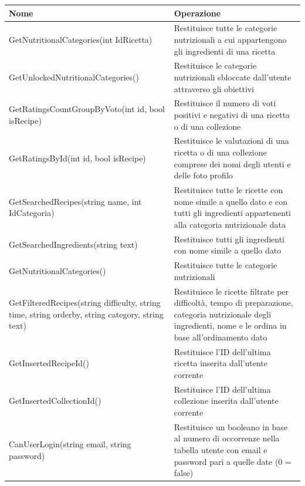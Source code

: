 ﻿\documentclass[a4paper,12pt]{report}
\begin{document}
\begin{table}[h!]
    \centering
    \begin{tabular}{ |p{3in}|p{2in}| }
        \hline
        \scriptsize{\textbf{Nome}} & \scriptsize{\textbf{Operazione}} \\
        \hline
        \scriptsize{GetNutritionalCategories(int IdRicetta)} & \scriptsize{Restituisce tutte le categorie nutrizionali a cui appartengono gli ingredienti di una ricetta} \\
        \hline
        \scriptsize{GetUnlockedNutritionalCategories()} & \scriptsize{Restituisce le categorie nutrizionali sbloccate dall'utente attraverso gli obiettivi} \\
        \hline
        \scriptsize{GetRatingsCountGroupByVoto(int id, bool isRecipe)} & \scriptsize{Restituisce il numero di voti positivi e negativi di una ricetta o di una collezione} \\
        \hline
        \scriptsize{GetRatingsById(int id, bool isRecipe)} & \scriptsize{Restituisce le valutazioni di una ricetta o di una collezione comprese dei nomi degli utenti e delle foto profilo} \\
        \hline
        \scriptsize{GetSearchedRecipes(string name, int IdCategoria)} & \scriptsize{Restituisce tutte le ricette con nome simile a quello dato e con tutti gli ingredienti appartenenti alla categoria nutrizionale data} \\
        \hline
        \scriptsize{GetSearchedIngredients(string text)} & \scriptsize{Restituisce tutti gli ingredienti con nome simile a quello dato} \\
        \hline
        \scriptsize{GetNutritionalCategories()} & \scriptsize{Restituisce tutte le categorie nutrizionali} \\
        \hline
        \scriptsize{GetFilteredRecipes(string difficulty, string time, string orderby, string category, string text)} & \scriptsize{Restituisce le ricette filtrate per difficoltà, tempo di preparazione, categoria nutrizionale degli ingredienti, nome e le ordina in base all'ordinamento dato} \\
        \hline
        \scriptsize{GetInsertedRecipeId()} & \scriptsize{Restituisce l'ID dell'ultima ricetta inserita dall'utente corrente} \\
        \hline
        \scriptsize{GetInsertedCollectionId()} & \scriptsize{Restituisce l'ID dell'ultima collezione inserita dall'utente corrente} \\
        \hline
        \scriptsize{CanUserLogin(string email, string password)} & \scriptsize{Restituisce un booleano in base al numero di occorrenze nella tabella utente con email e password pari a quelle date (0 = false)} \\

\end{tabular}
\end{table}
\end{document}
